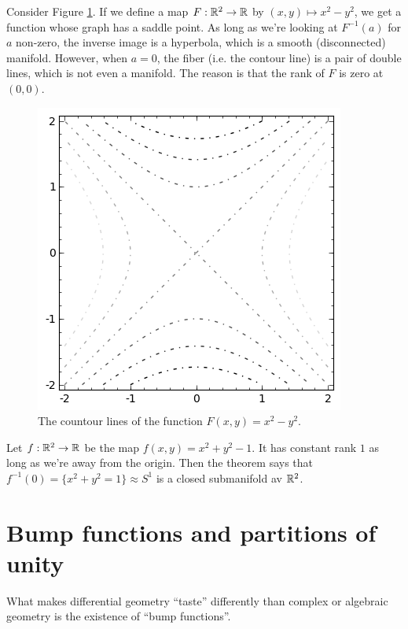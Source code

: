 \documentclass[11pt, english]{article}
\begin{document}
\begin{example}
Consider Figure \ref{contour}. If we define a map $F:\mathbb{R}^2\to \mathbb{R}$ by $(x,y) \mapsto x^2-y^2$, we get a function whose graph has a saddle point. As long as we're looking at $F^{-1}(a)$ for $a$ non-zero, the inverse image is a hyperbola, which is a smooth (disconnected) manifold. However, when $a=0$, the fiber (i.e. the contour line) is a pair of double lines, which is not even a manifold. The reason is that the rank of $F$ is zero at $(0,0)$.
\begin{figure}[ht]
\begin{center}
\includegraphics[scale=0.7]{contours}
\end{center}
\caption{The countour lines of the function $F(x,y)=x^2-y^2$.}
\label{contour}
\end{figure}
\end{example}

\begin{example}
Let $f:\mathbb{R}^2 \to \mathbb{R}$ be the map $f(x,y)=x^2+y^2-1$. It has constant rank $1$ as long as we're away from the origin. Then the theorem says that $f^{-1}(0)=\{ x^2+y^2=1 \}\approx S^1$ is a closed submanifold av $\mathbb{R}^2$.
\end{example}

\newpage
\section{Bump functions and partitions of unity}

What makes differential geometry ``taste'' differently than complex or algebraic geometry is the existence of ``bump functions''.
\end{document}
